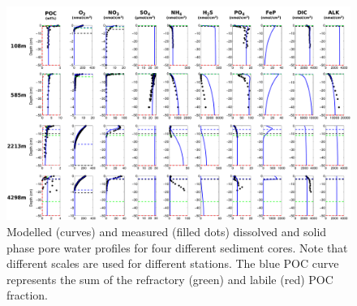 \documentclass[gmd, manuscript]{copernicus}
\begin{document}
\begin{figure}
	\includegraphics[width=1.0\textwidth]{figures/Profiles/0_ALL_PROFILES_COMBINED_1503.pdf}
	\caption{Modelled (curves) and measured (filled dots) dissolved and solid phase pore water profiles for four different sediment cores. Note that different 
	scales are used for different stations. The blue POC curve represents the sum of the refractory (green) and labile (red) POC fraction.}
	\label{fig:Sediment_profiles}
\end{figure}
\end{document}
